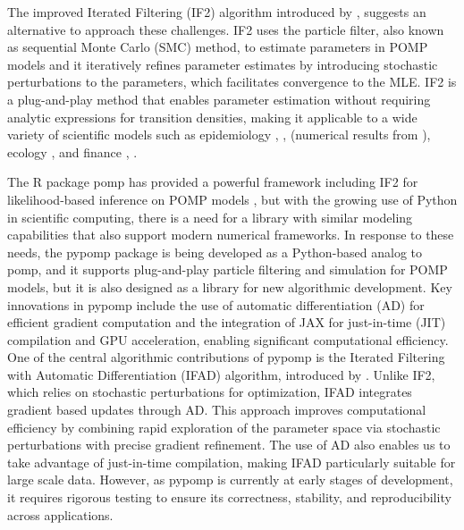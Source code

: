 \documentclass[11pt]{report}
\begin{document}
The improved Iterated Filtering (IF2) algorithm introduced by \textbf{\citet{ionides2015inference}}, suggests an alternative to approach these challenges. IF2 uses the particle filter, also known as sequential Monte Carlo (SMC) method, to estimate parameters in POMP models and it iteratively refines parameter estimates by introducing stochastic perturbations to the parameters, which facilitates convergence to the MLE. IF2 is a plug-and-play method that enables parameter estimation without requiring analytic expressions for transition densities, making it applicable to a wide variety of scientific models such as epidemiology 
\textbf{\citet{subramanian2021quantifying}}, \textbf{\citet{wheeler2024informing}}, \textbf{\citet{king2008inapparent}}(numerical results from \textbf{\citet{ionides2015inference}}), ecology \textbf{\citet{li2024inference}}, and finance \textbf{\citet{szczepocki2020application}}, \textbf{\citet{sunmodel}}.


The R package pomp has provided a powerful framework including IF2 for likelihood-based inference on POMP models \textbf{\citet{king2016statistical}}, but with the growing use of Python in scientific computing, there is a need for a library with similar modeling capabilities that also support modern numerical frameworks. In response to these needs, the pypomp package is being developed as a Python-based analog to pomp, and it supports plug-and-play particle filtering and simulation for POMP models, but it is also designed as a library for new algorithmic development. Key innovations in pypomp include the use of automatic differentiation (AD) for efficient gradient computation and the integration of JAX for just-in-time (JIT) compilation and GPU acceleration, enabling significant computational efficiency. One of the central algorithmic contributions of pypomp is the Iterated Filtering with Automatic Differentiation (IFAD) algorithm, introduced by \textbf{\citet{tan2024accelerated}}. Unlike IF2, which relies on stochastic perturbations for optimization, IFAD integrates gradient based updates through AD. This approach improves computational efficiency by combining rapid exploration of the parameter space via stochastic perturbations with precise gradient refinement. The use of AD also enables us to take advantage of just-in-time compilation, making IFAD particularly suitable for large scale data. However, as pypomp is currently at early stages of development, it requires rigorous testing to ensure its correctness, stability, and reproducibility across applications.
\end{document}
